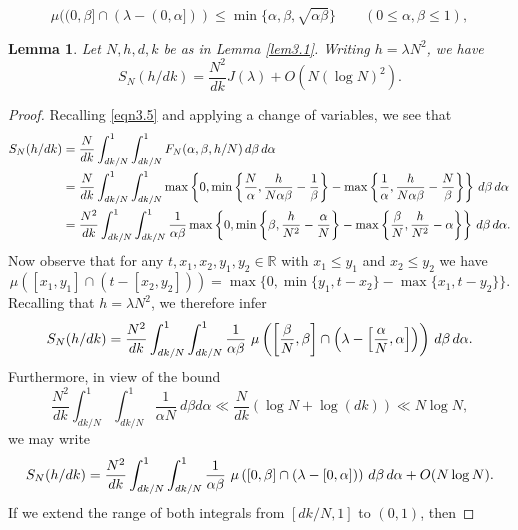 \documentclass[10pt,a4paper]{amsart}
\newtheorem{lemma}{Lemma}
\def \R {\mathbb{R}}
\def\d{{\,{\rm d}}}
\begin{document}
    \begin{equation}\label{eqn3.8}
        \mu( (0, \beta] \cap (\lambda - (0, \alpha]  ) ) \leqslant\min\{\alpha,\beta,\sqrt{\alpha\beta}\} \qquad(0\leqslant\alpha,\beta\leqslant 1),
    \end{equation}

\begin{lemma} \label{lem3.2}
    Let $N,h,d,k$ be as in Lemma \ref{lem3.1}. Writing $h = \lambda N^2$, we have
    \[ S_N(h/dk) = \frac{N^2}{dk} J(\lambda)  + O(N(\log N)^2 ). \]
\end{lemma}

\begin{proof}
Recalling \eqref{eqn3.5} and applying a change of variables, we see that
\begin{align*}
S_N(h/dk) & = \frac{N}{dk} \int_{dk/N}^1 \int_{dk/N}^1 F_N( \alpha, \beta , h/N)  \d \beta \d \alpha \\
& = \frac{N}{dk} \int_{dk/N}^1 \int_{dk/N}^1 \max\left\lbrace 0,\min\left\{\frac{N}{\alpha} ,  \frac{h}{N\alpha\beta} - \frac{1}{\beta} \right\}-\max\left\{ \frac{1}{\alpha}, \frac{h}{N\alpha\beta}-\frac{N}{\beta} \right\}\right\rbrace  \d \beta \d \alpha \\
& = \frac{N^2}{dk} \int_{dk/N}^1 \int_{dk/N}^1 \frac{1}{\alpha \beta} \max \left\{  0, \min\left\{ \beta, \frac{h}{N^2}-\frac{\alpha}{N} \right\} - \max \left\{ \frac{\beta}{N} , \frac{h}{N^2}-\alpha\right\} \right\}  \d \beta \d \alpha.
\end{align*}
Now observe that for any $t,x_1,x_2,y_1,y_2\in\R$ with $x_1 \leqslant y_1$ and $x_2 \leqslant y_2$ we have
\[ \mu([x_1, y_1] \cap (t - [x_2, y_2]) ) = \max \{ 0, \min\{ y_1, t - x_2\} - \max\{ x_1, t - y_2 \} \} .\]
Recalling that $h=\lambda N^2$, we therefore infer
\[ S_N(h/dk) = \frac{N^2}{dk} \int_{dk/N}^1 \int_{dk/N}^1 \frac{1}{\alpha \beta} \ \mu \left( \left[ \frac{\beta}{N}, \beta \right] \cap \left(\lambda - \left[ \frac{\alpha}{N}, \alpha \right] \right) \right)  \d \beta \d \alpha.  \]
Furthermore, in view of the bound
\[ \frac{N^2}{dk} \int_{dk/N}^1 \int_{dk/N}^1  \frac{1}{\alpha N} \ d \beta d \alpha \ll \frac{N}{dk} ( \log N + \log (dk) ) \ll N \log N, \]
we may write
\begin{equation*}
    S_N(h/dk) = \frac{N^2}{dk} \int_{dk/N}^1 \int_{dk/N}^1 \frac{1}{\alpha \beta} \ \mu \left( \left[ 0, \beta \right] \cap \left(\lambda - \left[ 0, \alpha \right] \right) \right)  \d \beta \d \alpha +O(N\log N).
\end{equation*}
If we extend the range of both integrals from $[dk/N,1]$ to $(0,1)$, then

\end{proof}
\end{document}
